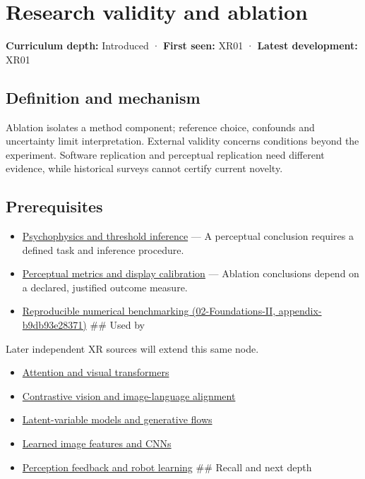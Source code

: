 \hypertarget{appendix-65788587ef78}{}
\section{Research validity and ablation}\label{appendix-65788587ef78-research-validity-and-ablation}

\textbf{Curriculum depth:} Introduced · \textbf{First seen:} XR01 · \textbf{Latest development:} XR01

\subsection{Definition and mechanism}\label{appendix-65788587ef78-definition-and-mechanism}

Ablation isolates a method component; reference choice, confounds and uncertainty limit interpretation. External validity concerns conditions beyond the experiment. Software replication and perceptual replication need different evidence, while historical surveys cannot certify current novelty.

\subsection{Prerequisites}\label{appendix-65788587ef78-prerequisites}

\begin{itemize}
\item
  \hyperref[appendix-1759f03e8ce7]{Psychophysics and threshold inference} --- A perceptual conclusion requires a defined task and inference procedure.
\item
  \hyperref[appendix-b2c1846508bf]{Perceptual metrics and display calibration} --- Ablation conclusions depend on a declared, justified outcome measure.
\item
  \href{../02-Foundations-II/main.pdf\#nameddest=appendix-b9db93e28371}{Reproducible numerical benchmarking (02-Foundations-II, appendix-b9db93e28371)} \#\# Used by
\end{itemize}

Later independent XR sources will extend this same node.

\begin{itemize}
\tightlist
\item
  \hyperref[appendix-a9d5dfdd164a]{Attention and visual transformers}
\item
  \hyperref[appendix-772f1fd96148]{Contrastive vision and image-language alignment}
\item
  \hyperref[appendix-2c568f05ee34]{Latent-variable models and generative flows}
\item
  \hyperref[appendix-47c51ea026fb]{Learned image features and CNNs}
\item
  \hyperref[appendix-b0c42da325f1]{Perception feedback and robot learning} \#\# Recall and next depth
\end{itemize}


